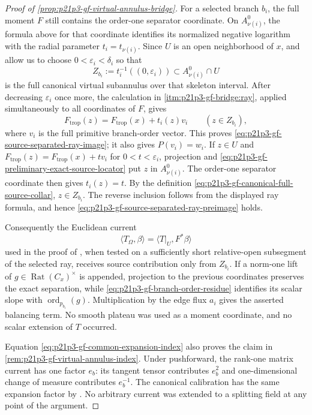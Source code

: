 \begin{proof}[Proof of
\cref{prop:p21p3-gf-virtual-annulus-bridge}]
For a selected branch \(b_i\), the full moment \(F\) still contains the
order-one separator coordinate.  On \(A_{\nu(i)}^0\), the formula above for
that coordinate identifies its normalized negative logarithm with the radial
parameter \(t_i=t_{\nu(i)}\).  Since \(U\) is an open neighborhood of \(x\),
\cite[\S4.3.10.3]{Ducros24CurveStructure} and
\cite[\S\S3.6.35.9--3.6.35.10]{Ducros24CurveStructure} allow us to choose
\(0<\varepsilon_i<\delta_i\) so that
\begin{equation}
 Z_{b_i}:=t_i^{-1}((0,\varepsilon_i))
       \subset A_{\nu(i)}^0\cap U
 \label{eq:p21p3-gf-canonical-full-source-collar}
\end{equation}
is the full canonical virtual subannulus over that skeleton interval.  After
decreasing \(\varepsilon_i\) once more, the calculation in
\cref{itm:p21p3-gf-bridge:ray}, applied simultaneously to all coordinates of
\(F\), gives
\[
 F_{\mathrm{trop}}(z)=F_{\mathrm{trop}}(x)+t_i(z)v_i
 \qquad(z\in Z_{b_i}),
\]
where \(v_i\) is the full primitive branch-order vector.  This proves
\eqref{eq:p21p3-gf-source-separated-ray-image}; it also gives
\(P(v_i)=w_i\).  If \(z\in U\) and
\(F_{\mathrm{trop}}(z)=F_{\mathrm{trop}}(x)+t v_i\) for
\(0<t<\varepsilon_i\), projection and
\eqref{eq:p21p3-gf-preliminary-exact-source-locator} put \(z\) in
\(A_{\nu(i)}^0\).  The order-one separator coordinate then gives
\(t_i(z)=t\).  By the definition
\eqref{eq:p21p3-gf-canonical-full-source-collar}, \(z\in Z_{b_i}\).  The
reverse inclusion follows from the displayed ray formula, and hence
\eqref{eq:p21p3-gf-source-separated-ray-preimage} holds.

Consequently the Euclidean current
\[
 \langle T_{\Omega},\beta\rangle
       =\langle T|_U,F^*\beta\rangle
\]
used in the proof of \cite[Theorem~16.8.5]{CLD25}, when tested on a
sufficiently short relative-open subsegment of the selected ray, receives
source contribution only from \(Z_{b_i}\).  If a norm-one lift of
\(g\in\operatorname{Rat}(C_x)^\times\) is appended, projection to the
previous coordinates preserves the exact separation, while
\eqref{eq:p21p3-gf-branch-order-residue} identifies its scalar slope with
\(\operatorname{ord}_{p_{b_i}}(g)\).  Multiplication by the edge flux \(a_i\)
gives the asserted balancing term.  No smooth plateau was used as a moment
coordinate, and no scalar extension of \(T\) occurred.

Equation \eqref{eq:p21p3-gf-common-expansion-index} also proves the claim in
\cref{rem:p21p3-gf-virtual-annulus-index}.  Under pushforward, the rank-one
matrix current has one factor \(e_b\): its tangent tensor contributes
\(e_b^2\) and one-dimensional change of measure contributes \(e_b^{-1}\).
The canonical calibration has the same expansion factor by
\cite[\S14.3.2, Lemma~14.3.4, and Proposition~14.4.2]{CLD25}.  No arbitrary
current was extended to a splitting field at any point of the argument.
\end{proof}

